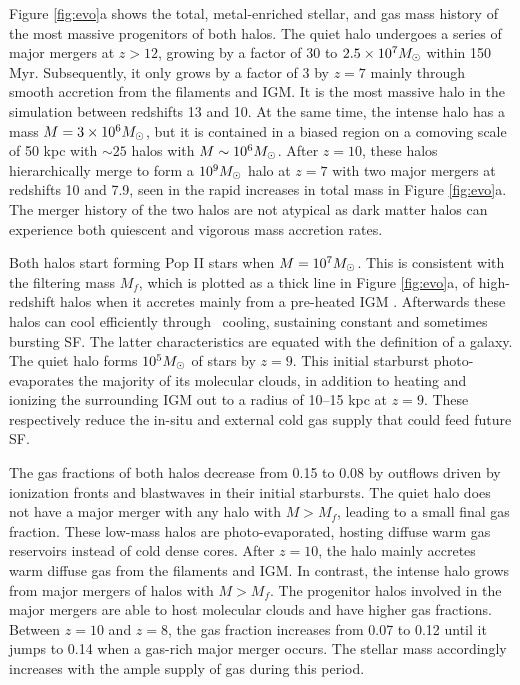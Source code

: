 \documentclass[12pt,preprint]{aastex}
\begin{document}

Figure \ref{fig:evo}a shows the total, metal-enriched stellar, and gas
mass history of the most massive progenitors of both halos.  The quiet
halo undergoes a series of major mergers at $z > 12$, growing by a
factor of 30 to $2.5 \times 10^7 \Ms$ within 150 Myr.  Subsequently,
it only grows by a factor of 3 by $z=7$ mainly through smooth
accretion from the filaments and IGM.  It is the most massive halo in
the simulation between redshifts 13 and 10.  At the same time, the
intense halo has a mass $M = 3 \times 10^6 \Ms$, but it is contained
in a biased region on a comoving scale of 50 kpc with $\sim25$ halos
with $M \sim 10^6 \Ms$.  After $z=10$, these halos hierarchically
merge to form a $10^9 \Ms$ halo at $z=7$ with two major mergers at
redshifts 10 and 7.9, seen in the rapid increases in total mass in
Figure \ref{fig:evo}a.  The merger history of the two halos are not
atypical as dark matter halos can experience both quiescent and
vigorous mass accretion rates.

Both halos start forming Pop II stars when $M = 10^7 \Ms$.  This is
consistent with the filtering mass $M_f$, which is plotted as a thick
line in Figure \ref{fig:evo}a, of high-redshift halos when it accretes
mainly from a pre-heated IGM \citep{gnedin98, gnedin00, Wise08_Gal}.
Afterwards these halos can cool efficiently through \hh~cooling,
sustaining constant and sometimes bursting SF.  The latter
characteristics are equated with the definition of a galaxy.  The
quiet halo forms $10^5 \Ms$ of stars by $z=9$.  This initial starburst
photo-evaporates the majority of its molecular clouds, in addition to
heating and ionizing the surrounding IGM out to a radius of 10--15 kpc
at $z=9$.  These respectively reduce the in-situ and external cold gas
supply that could feed future SF.

The gas fractions of both halos decrease from 0.15 to 0.08 by outflows
driven by ionization fronts and blastwaves in their initial
starbursts.  The quiet halo does not have a major merger with any halo
with $M > M_f$, leading to a small final gas fraction.  These low-mass
halos are photo-evaporated, hosting diffuse warm gas reservoirs
instead of cold dense cores.  After $z=10$, the halo mainly accretes
warm diffuse gas from the filaments and IGM.  In contrast, the intense
halo grows from major mergers of halos with $M > M_f$.  The progenitor
halos involved in the major mergers are able to host molecular clouds
and have higher gas fractions.  Between $z=10$ and $z=8$, the gas
fraction increases from 0.07 to 0.12 until it jumps to 0.14 when a
gas-rich major merger occurs.  The stellar mass accordingly increases
with the ample supply of gas during this period.  
\end{document}
